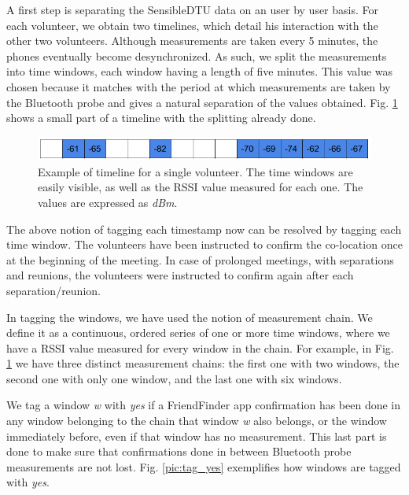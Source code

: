 A first step is separating the SensibleDTU data on an user by user basis. For each volunteer, we obtain two timelines, which detail his interaction with the other two volunteers. Although measurements are taken every 5 minutes, the phones eventually become desynchronized. As such, we split the measurements into time windows, each window having a length of five minutes. This value was chosen because it matches with the period at which measurements are taken by the Bluetooth probe and gives a natural separation of the values obtained. Fig. \ref{pic:value_chain} shows a small part of a timeline with the splitting already done.

\begin{figure}[h]
	\begin{center}
		\includegraphics[scale=0.6]{figures/timechain.png}
	\end{center}
	
	\caption{Example of timeline for a single volunteer. The time windows are easily visible, as well as the RSSI value measured for each one. The values are expressed as \textit{dBm}.}
	\label{pic:value_chain}

\end{figure}

The above notion of tagging each timestamp now can be resolved by tagging each time window. The volunteers have been instructed to confirm the co-location once at the beginning of the meeting. In case of prolonged meetings, with separations and reunions, the volunteers were instructed to confirm again after each separation/reunion.   

In tagging the windows, we have used the notion of measurement chain. We define it as a continuous, ordered series of one or more time windows, where we have a RSSI value measured for every window in the chain. For example, in Fig. \ref{pic:value_chain} we have three distinct measurement chains: the first one with two windows, the second one with only one window, and the last one with six windows.

We tag a window \textit{w} with \textit{yes} if a FriendFinder app confirmation has been done in any window belonging to the chain that window \textit{w} also belongs, or the window immediately before, even if that window has no measurement. This last part is done to make sure that confirmations done in between Bluetooth probe measurements are not lost. Fig. \ref{pic:tag_yes} exemplifies how windows are tagged with \textit{yes}. 

